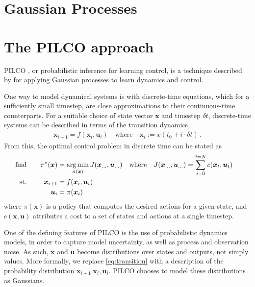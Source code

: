\documentclass[main.tex]{subfiles}
\begin{document}
\section{Gaussian Processes}

\section{The PILCO approach}

	PILCO \cite{pilco}, or probabilistic inference for learning control, is a technique described by \citeauthor{pilco} for applying Gaussian processes to learn dynamics and control.

	One way to model dynamical systems is with discrete-time equations, which for a sufficiently small timestep, are close approximations to their continuous-time counterparts.
	For a suitable choice of state vector $\bm{x}$ and timestep $\delta t$, discrete-time systems can be described in terms of the transition dynamics,
	\begin{align}
		\bm{x}_{i + 1} = f(\bm{x}_{i}, \bm{u}_{i}) \quad \text{where} \quad \bm{x}_{i} := x(t_0 + i\cdot\delta t)\,. \label{eq:transition}
	\end{align}
	From this, the optimal control problem in discrete time can be stated as
	\begin{alignat}{2}
		\text{find}&& \quad
			\pi^*(\bm{x}) &= \operatorname*{arg\,min}_{\pi(\bm{x})}
				J(\bm{x}_{...}, \bm{u}_{...})
				\quad \text{where} \quad
				J(\bm{x}_{...}, \bm{u}_{...}) = \sum_{i=0}^{i=N} c(\bm{x}_t, \bm{u}_t)\quad \\
		\text{st.}&& \quad
			\bm{x}_{i+1} &= f(\bm{x}_{i}, \bm{u}_{i}) \\
		&&
			\bm{u}_i &= \pi(\bm{x}_i)\,
	\end{alignat}
	where $\pi(\bm{x})$ is a policy that computes the desired actions for a given state, and $c(\bm{x}, \bm{u})$ attributes a cost to a set of states and actions at a single timestep.

	One of the defining features of PILCO is the use of probabilistic dynamics models, in order to capture model uncertainty, as well as process and observation noise. As such, $\bm{x}$ and $\bm{u}$ become distributions over states and outputs, not simply values\footnotemark.
	More formally, we replace \cref{eq:transition} with a description of the probability distribution $\bm{x}_{i+1}|\bm{x}_i,\bm{u}_{i}$.
	PILCO chooses to model these distributions as Gaussians.

\end{document}
